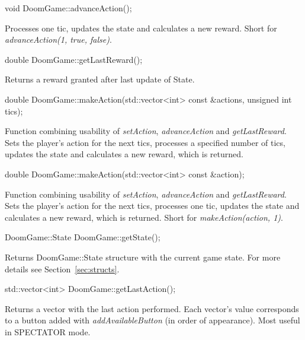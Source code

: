 \vspace{20pt}
\begin{clinee}
	void DoomGame::advanceAction();
\end{clinee}

	Processes one tic, updates the state and calculates a new reward. Short for \emph{advanceAction(1, true, false)}.


\vspace{20pt}
\begin{clinee}
	double DoomGame::getLastReward();
\end{clinee}

	Returns a reward granted after last update of State. 


\vspace{20pt}
\begin{clinee}
	double DoomGame::makeAction(std::vector<int> const &actions, unsigned int tics);
\end{clinee}

	Function combining usability of \emph{setAction}, \emph{advanceAction} and \emph{getLastReward}. Sets the player's action for the next tics, processes a specified number of tics, updates the state and calculates a new reward, which is returned.

\vspace{20pt}   
\begin{clinee}
	double DoomGame::makeAction(std::vector<int> const &action);
\end{clinee}

	Function combining usability of \emph{setAction}, \emph{advanceAction} and \emph{getLastReward}. Sets the player's action for the next tics, processes one tic, updates the state and calculates a new reward, which is returned. Short for \emph{makeAction(action, 1)}.


\vspace{20pt}
\begin{clinee}
	DoomGame::State DoomGame::getState();
\end{clinee}

	Returns DoomGame::State structure with the current game state. For more details see Section~\ref{sec:structs}.


\vspace{20pt}
\begin{clinee}
	std::vector<int> DoomGame::getLastAction();
\end{clinee}

	Returns a vector with the last action performed. Each vector's value corresponds to a button added with \emph{addAvailableButton} (in order of appearance). Most useful in SPECTATOR mode.



